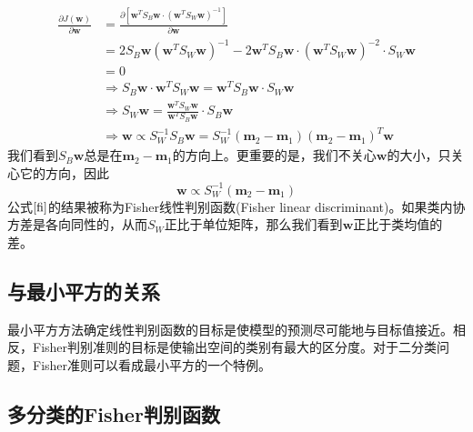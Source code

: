\begin{equation}
	\begin{aligned}
	\frac{\partial J(\boldsymbol{w})}{\partial \boldsymbol{w}}&=\frac{\partial [\boldsymbol{w}^TS_B\boldsymbol{w}\cdot (\boldsymbol{w}^TS_W\boldsymbol{w})^{-1}]}{\partial\boldsymbol{w}}\\
		&=2S_B\boldsymbol{w}(\boldsymbol{w}^TS_W\boldsymbol{w})^{-1}-2\boldsymbol{w}^TS_B\boldsymbol{w}\cdot (\boldsymbol{w}^TS_W\boldsymbol{w})^{-2}\cdot S_W\boldsymbol{w}\\
		&=0\\
		&\Rightarrow S_B\boldsymbol{w}\cdot \boldsymbol{w}^TS_W\boldsymbol{w}=\boldsymbol{w}^TS_B\boldsymbol{w}\cdot  S_W\boldsymbol{w}\\
		&\Rightarrow S_W\boldsymbol{w}=\frac{\boldsymbol{w}^TS_W\boldsymbol{w}}{\boldsymbol{w}^TS_B\boldsymbol{w}}\cdot S_B\boldsymbol{w}\\
		&\Rightarrow \boldsymbol{w} \propto S_W^{-1}S_B\boldsymbol{w}=S_W^{-1}(\boldsymbol{m}_2-\boldsymbol{m}_1)(\boldsymbol{m}_2-\boldsymbol{m}_1)^T\boldsymbol{w}
	\end{aligned}
\end{equation}
我们看到$S_B\boldsymbol{w}$总是在$\boldsymbol{m}_2-\boldsymbol{m}_1$的方向上。更重要的是，我们不关心$\boldsymbol{w}$的大小，只关心它的方向，因此
\begin{equation}
\label{fi}
	\boldsymbol{w}\propto S_W^{-1}(\boldsymbol{m}_2-\boldsymbol{m}_1)
\end{equation}
公式$\ref{fi}$的结果被称为Fisher线性判别函数(Fisher linear discriminant)。如果类内协方差是各向同性的，从而$S_W$正比于单位矩阵，那么我们看到$\boldsymbol{w}$正比于类均值的差。
\subsection*{与最小平方的关系}
最小平方方法确定线性判别函数的目标是使模型的预测尽可能地与目标值接近。相反，Fisher判别准则的目标是使输出空间的类别有最大的区分度。对于二分类问题，Fisher准则可以看成最小平方的一个特例。
\subsection*{多分类的Fisher判别函数}
